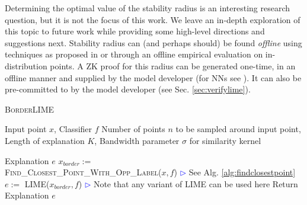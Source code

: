 Determining the optimal value of the stability radius is an interesting research question, but it is not the focus of this work. We leave an in-depth exploration of this topic to future work while providing some high-level directions and suggestions next. Stability radius can (and perhaps should) be found \textit{offline} using techniques as proposed in \cite{jordan2019provable, yadav2024fairproofconfidentialcertifiable} or through an offline empirical evaluation on in-distribution points. A ZK proof for this radius can be generated one-time, in an offline manner and supplied by the model developer (for NNs see \cite{yadav2024fairproofconfidentialcertifiable}). It can also be  pre-committed to by the model developer (see Sec. \ref{sec:verifylime}).  



\begin{algorithm}[tbh]
\begin{algorithmic}[1]
 \caption{\textsc{BorderLIME}}
   \label{alg:robustLIME_highlevel}
    
     Input point $x$, Classifier $f$
     Number of points $n$ to be sampled around input point, Length of explanation $K$, Bandwidth parameter $\sigma$ for similarity kernel

     Explanation $e$
    \STATE
    \STATE $x_{border}:=$\\\hspace{2em}\textsc{Find\_Closest\_Point\_With\_Opp\_Label}($x, f$) \hfill \textcolor{blue}{$\rhd$} See Alg. \ref{alg:findclosestpoint}
    \STATE $e :=$ \textsc{LIME}($x_{border}, f$) \textcolor{blue}{$\rhd$} Note that any variant of LIME can be used here
    \STATE Return Explanation $e$
\end{algorithmic}
\end{algorithm}

